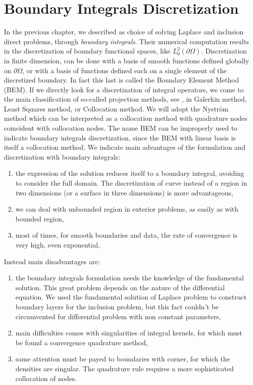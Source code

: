 \documentclass[10pt, a4paper, twoside, openright]{book}
\theoremstyle{definition}
\theoremstyle{plain}
\theoremstyle{plain}
\theoremstyle{plain}
\theoremstyle{plain}
\theoremstyle{plain}
\theoremstyle{plain}
\theoremstyle{plain}
\theoremstyle{plain}
\begin{document}
\section{Boundary Integrals Discretization}
In the previous chapter, we described as choice of solving Laplace and inclusion direct problems, through \emph{boundary integrals}. Their numerical computation results in the discretization of boundary functional spaces, like $L^2_0(\partial \Omega)$. 
Discretization in finite dimension, can be done with a basis of smooth functions defined globally on $\partial \Omega$, or with a basis of functions defined each on a single element of the discretized boundary. In fact this last is called the Boundary Element Method (BEM). 
If we directly look for a discretization of integral operators, we come to the main classification of so-called projection methods, see \cite{kirsch:book}, in Galerkin method, Least Squares method, or Collocation method. We will adopt the Nystr\"{o}m method which can be interpreted as a collocation method with quadrature nodes coincident with collocation nodes. The name BEM can be improperly used to indicate boundary integrals discretization, since the BEM with linear basis is itself a collocation method.
We indicate main advantages of the formulation and discretization with boundary integrals:
\begin{enumerate}
 \item the expression of the solution reduces itself to a boundary integral, avoiding to consider the full domain. The discretization of curve instead of a region in two dimensions (or a surface in three dimensions) is more advantageous,
 \item we can deal with unbounded region in exterior problems, as easily as with bounded region,
 \item most of times, for smooth boundaries and data, the rate of convergence is very high, even exponential,
\end{enumerate}
Instead main disadvantages are:
\begin{enumerate}
 \item the boundary integrals formulation needs the knowledge of the fundamental solution. This great problem depends on the nature of the differential equation. We used the fundamental solution of Laplace problem to construct boundary layers for the inclusion problem, but this fact couldn't be circumvented for differential problem with non constant parameters,
 \item main difficulties comes with singularities of integral kernels, for which must be found a convergence quadrature method,
 \item same attention must be payed to boundaries with corner, for which the densities are singular. The quadrature rule requires a more sophisticated collocation of nodes.
\end{enumerate}
\end{document}
